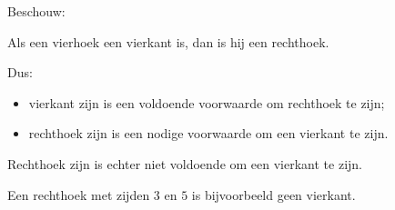 \documentclass{ximera}
\begin{document}
\begin{voorbeeld}

Beschouw:

\begin{center}
Als een vierhoek een vierkant is, dan is hij een rechthoek.
\end{center}

Dus:

\begin{itemize}

  \item vierkant zijn is een voldoende voorwaarde om rechthoek te zijn;

  \item rechthoek zijn is een nodige voorwaarde om een vierkant te zijn.

\end{itemize}

Rechthoek zijn is echter niet voldoende om een vierkant te zijn.

Een rechthoek met zijden $3$ en $5$ is bijvoorbeeld geen vierkant.

\end{voorbeeld}
\end{document}

